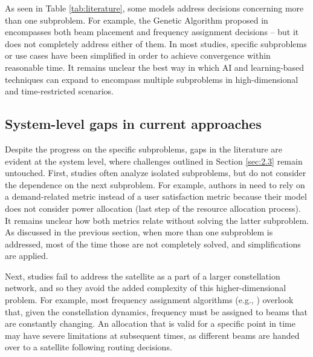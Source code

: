 \documentclass[letterpaper]{article} %
\begin{document}
As seen in Table \ref{tab:literature}, some models address decisions concerning more than one subproblem. For example, the Genetic Algorithm proposed in \cite{Angeletti2006} encompasses both beam placement and frequency assignment decisions -- but it does not completely address either of them. In most studies, specific subproblems or use cases have been simplified in order to achieve convergence within reasonable time. It remains unclear the best way in which AI and learning-based techniques can expand to encompass multiple subproblems in high-dimensional and time-restricted scenarios.




\subsection{System-level gaps in current approaches}


Despite the progress on the specific subproblems, gaps in the literature are evident at the system level, where challenges outlined in Section \ref{sec:2.3} remain untouched. First, studies often analyze isolated subproblems, but do not consider the dependence on the next subproblem. For example, authors in \cite{Camino2014} need to rely on a demand-related metric instead of a user satisfaction metric because their model does not consider power allocation (last step of the resource allocation process). It remains unclear how both metrics relate without solving the latter subproblem. As discussed in the previous section, when more than one subproblem is addressed, most of the time those are not completely solved, and simplifications are applied. 

Next, studies fail to address the satellite as a part of a larger constellation network, and so they avoid the added complexity of this higher-dimensional problem. For example, most frequency assignment algorithms (e.g., \cite{vidal2020joint, liao2020distributed}) overlook that, given the constellation dynamics, frequency must be assigned to beams that are constantly changing. An allocation that is valid for a specific point in time may have severe limitations at subsequent times, as different beams are handed over to a satellite following routing decisions. 
\end{document}
